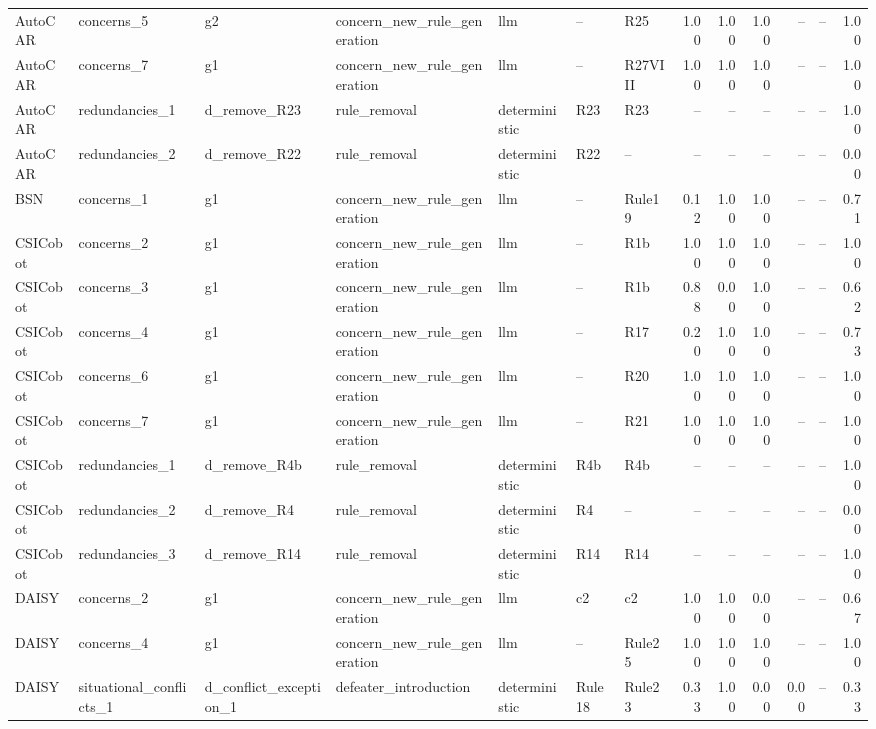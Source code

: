 \begin{table}[t]
{\begin{tabular}{lllllllrrrrrr}
AutoCAR & concerns\_5 & g2 & concern\_new\_rule\_generation & llm & -- & R25 & 1.00 & 1.00 & 1.00 & -- & -- & 1.00 \\
AutoCAR & concerns\_7 & g1 & concern\_new\_rule\_generation & llm & -- & R27VIII & 1.00 & 1.00 & 1.00 & -- & -- & 1.00 \\
AutoCAR & redundancies\_1 & d\_remove\_R23 & rule\_removal & deterministic & R23 & R23 & -- & -- & -- & -- & -- & 1.00 \\
AutoCAR & redundancies\_2 & d\_remove\_R22 & rule\_removal & deterministic & R22 & -- & -- & -- & -- & -- & -- & 0.00 \\
\midrule
BSN & concerns\_1 & g1 & concern\_new\_rule\_generation & llm & -- & Rule19 & 0.12 & 1.00 & 1.00 & -- & -- & 0.71 \\
\midrule
CSICobot & concerns\_2 & g1 & concern\_new\_rule\_generation & llm & -- & R1b & 1.00 & 1.00 & 1.00 & -- & -- & 1.00 \\
CSICobot & concerns\_3 & g1 & concern\_new\_rule\_generation & llm & -- & R1b & 0.88 & 0.00 & 1.00 & -- & -- & 0.62 \\
CSICobot & concerns\_4 & g1 & concern\_new\_rule\_generation & llm & -- & R17 & 0.20 & 1.00 & 1.00 & -- & -- & 0.73 \\
CSICobot & concerns\_6 & g1 & concern\_new\_rule\_generation & llm & -- & R20 & 1.00 & 1.00 & 1.00 & -- & -- & 1.00 \\
CSICobot & concerns\_7 & g1 & concern\_new\_rule\_generation & llm & -- & R21 & 1.00 & 1.00 & 1.00 & -- & -- & 1.00 \\
CSICobot & redundancies\_1 & d\_remove\_R4b & rule\_removal & deterministic & R4b & R4b & -- & -- & -- & -- & -- & 1.00 \\
CSICobot & redundancies\_2 & d\_remove\_R4 & rule\_removal & deterministic & R4 & -- & -- & -- & -- & -- & -- & 0.00 \\
CSICobot & redundancies\_3 & d\_remove\_R14 & rule\_removal & deterministic & R14 & R14 & -- & -- & -- & -- & -- & 1.00 \\
\midrule
DAISY & concerns\_2 & g1 & concern\_new\_rule\_generation & llm & c2 & c2 & 1.00 & 1.00 & 0.00 & -- & -- & 0.67 \\
DAISY & concerns\_4 & g1 & concern\_new\_rule\_generation & llm & -- & Rule25 & 1.00 & 1.00 & 1.00 & -- & -- & 1.00 \\
DAISY & situational\_conflicts\_1 & d\_conflict\_exception\_1 & defeater\_introduction & deterministic & Rule18 & Rule23 & 0.33 & 1.00 & 0.00 & 0.00 & -- & 0.33 \\

\end{tabular}}
\end{table}
